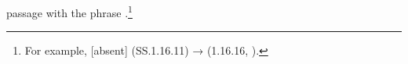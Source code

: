 passage with the phrase .\footnote{For example, [absent] (SS.1.16.11) 
→  (1.16.16, \cite[79]{vulgate}).} 











